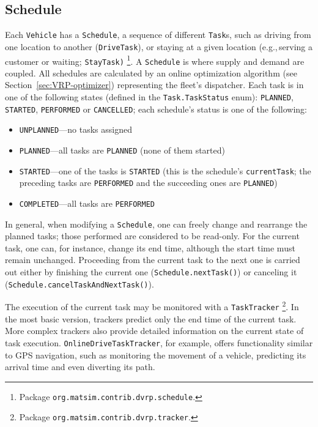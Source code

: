 \subsection{Schedule}
\label{sec:VRP-schedule}
Each \lstinline$Vehicle$ has a \lstinline$Schedule$, a sequence of different \lstinline$Task$s, such as driving from one location to another (\lstinline$DriveTask$), or staying at a given location (e.g.,\,serving a customer or waiting;  \lstinline$StayTask)$%
\footnote{
Package \lstinline$org.matsim.contrib.dvrp.schedule$.
}. A \lstinline$Schedule$ is where supply and demand are coupled. All schedules are calculated by an online optimization algorithm (see Section~\ref{sec:VRP-optimizer}) representing the fleet's dispatcher. Each task is in one of the following states (defined in the \lstinline$Task.TaskStatus$ enum): \lstinline$PLANNED$, \lstinline$STARTED$, \lstinline$PERFORMED$ or \lstinline$CANCELLED$; each schedule's status is one of the following:
%
\begin{itemize}
	\item \lstinline$UNPLANNED$---no tasks assigned
	
	\item \lstinline$PLANNED$---all tasks are \lstinline$PLANNED$ (none of them started)
	
	\item \lstinline$STARTED$---one of the tasks is \lstinline$STARTED$ (this is the schedule's \lstinline$currentTask$; the preceding tasks are \lstinline$PERFORMED$ and the succeeding ones are \lstinline$PLANNED$)
	
	\item \lstinline$COMPLETED$---all tasks are \lstinline$PERFORMED$
\end{itemize}
%
In general, when modifying a \lstinline$Schedule$, one can freely change and rearrange the planned tasks; those performed are considered to be read-only. For the current task, one can, for instance, change its end time, although the start time must remain unchanged. Proceeding from the current task to the next one is carried out either by finishing the current one (\lstinline$Schedule.nextTask()$) or canceling it (\lstinline$Schedule.cancelTaskAndNextTask()$).

The execution of the current task may be monitored with a \lstinline$TaskTracker$%
\footnote{
Package \lstinline$org.matsim.contrib.dvrp.tracker$.
}.
In the most basic version, trackers predict only the end time of the current task. More complex trackers also provide detailed information on the current state of task execution. \lstinline$OnlineDriveTaskTracker$, for example, offers functionality similar to GPS navigation, such as monitoring the movement of a vehicle, predicting its arrival time and even diverting its path.

